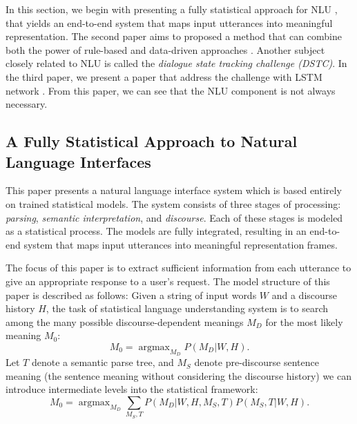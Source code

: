 \documentclass[paper=a4, fontsize=18pt]{article} %
\numberwithin{equation}{section} %
\numberwithin{figure}{section} %
\numberwithin{table}{section} %
\begin{document}
In this section, we begin with presenting a fully statistical approach for NLU \cite{Miller1996}, that yields an end-to-end system that maps input utterances into meaningful representation. The second paper aims to proposed a method that can combine both the power of rule-based and data-driven approaches \cite{Rayner2003}. Another subject closely related to NLU is called the \emph{dialogue state tracking challenge (DSTC)}. In the third paper, we present a paper that address the challenge with LSTM network \cite{Zilka2015}. From this paper, we can see that the NLU component is not always necessary.

\subsection{A Fully Statistical Approach to Natural Language Interfaces \cite{Miller1996}}

This paper presents a natural language interface system which is based entirely on trained statistical models. The system consists of three stages of processing: \emph{parsing}, \emph{semantic interpretation}, and \emph{discourse}. Each of these stages is modeled as a statistical process. The models are fully integrated, resulting in an end-to-end system that maps input utterances into meaningful representation frames.

The focus of this paper is to extract sufficient information from each utterance to give an appropriate response to a user's request. The model structure of this paper is described as follows: Given a string of input words $W$ and a discourse history $H$, the task of statistical language understanding system is to search among the many possible discourse-dependent meanings $M_D$ for the most likely meaning $M_0$:
$$M_0 = \mathop{\arg \max}_{M_D} P(M_D | W, H).$$
Let $T$ denote a semantic parse tree, and $M_S$ denote pre-discourse sentence meaning (the sentence meaning without considering the discourse history) we can introduce intermediate levels into the statistical framework:
$$M_0 = \mathop{\arg \max}_{M_D} \sum_{M_S, T} P(M_D | W, H, M_S, T) P(M_S, T | W, H).$$
\end{document}
